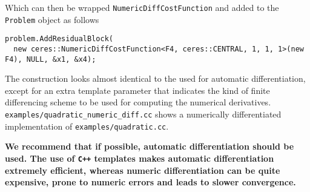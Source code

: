 Which can then be wrapped \texttt{NumericDiffCostFunction} and added to the \texttt{Problem} object as follows

\begin{verbatim}
problem.AddResidualBlock(
  new ceres::NumericDiffCostFunction<F4, ceres::CENTRAL, 1, 1, 1>(new F4), NULL, &x1, &x4);
\end{verbatim}

The construction looks almost identical to the used for automatic differentiation, except for an extra template parameter that indicates the kind of finite differencing scheme to be used for computing the numerical derivatives. \texttt{examples/quadratic\_numeric\_diff.cc} shows a numerically differentiated implementation of \texttt{examples/quadratic.cc}.

\textbf{We recommend that if possible,  automatic differentiation should be used. The use of
\texttt{C++} templates makes automatic differentiation extremely efficient,
whereas numeric differentiation can be quite expensive, prone to
numeric errors and leads to slower convergence.}
